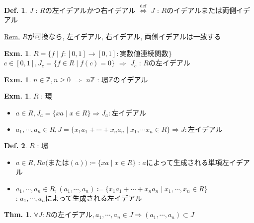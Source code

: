 \documentclass[uplatex,dvipdfmx,9pt]{beamer}
\newcommand{\defarrow}{\overset{\mathrm{def}}{\Leftrightarrow}}
\newcounter{textExmCount}
\theoremstyle{definition} %
\newtheorem{defn}{Def.}[subsection] %
\newtheorem{thm}{Thm.}[subsection] %
\theoremstyle{example}
\newtheorem{exmText}[textExmCount]{Exm.}
\begin{document}
    \begin{frame}

      \begin{defn}
        $J$ : $R$の左イデアルかつ右イデアル $\defarrow$ $J$ : $R$の\alert{イデアル}または\alert{両側イデアル}
      \end{defn}
      \underline{Rem.} $R$が可換なら, 左イデアル, 右イデアル, 両側イデアルは一致する
 
      \begin{exmText}
        $R = \{f \mid f\colon [0,1] \to [0,1] : \text{実数値連続関数}\}$ \\
        $c \in [0,1], J_c = \{f \in R \mid f(c) = 0\}$ $\Rightarrow$ $J_c$ : $R$の左イデアル
      \end{exmText}

      \begin{exmText}
        $n \in \mathbb{Z}, n \ge 0$ $\Rightarrow$ $n\mathbb{Z}$ : 環$\mathbb{Z}$のイデアル
      \end{exmText}

    \end{frame}

    \begin{frame}

      \begin{exmText}
        $R$ : 環
        \begin{itemize}
          \item $a \in R, J_a = \{xa \mid x \in R\} \Rightarrow J_a : \text{左イデアル}$
          \item $a_1, \cdots, a_n \in R, J = \{x_1a_1 + \cdots + x_na_n \mid x_1, \cdots x_n \in R\} \Rightarrow J : \text{左イデアル}$
        \end{itemize}
      \end{exmText}

      \begin{defn}
        $R$ : 環
        \begin{itemize}
          \item $a \in R, Ra \text{(または$(a)$)} \coloneqq \{xa \mid x \in R\}$ : $a$によって\alert{生成}される\alert{単項左イデアル}
          \item $a_1, \cdots, a_n \in R, (a_1, \cdots, a_n) \coloneqq \{x_1a_1 + \cdots + x_na_n \mid x_1, \cdots, x_n \in R\}$ \\
                : $a_1, \cdots, a_n$によって\alert{生成}される左イデアル
        \end{itemize}
      \end{defn}

      \begin{thm}
        $\forall J : \text{$R$の左イデアル}, a_1, \cdots, a_n \in J \Rightarrow (a_1, \cdots, a_n) \subset J$
      \end{thm}

    \end{frame}
\end{document}
